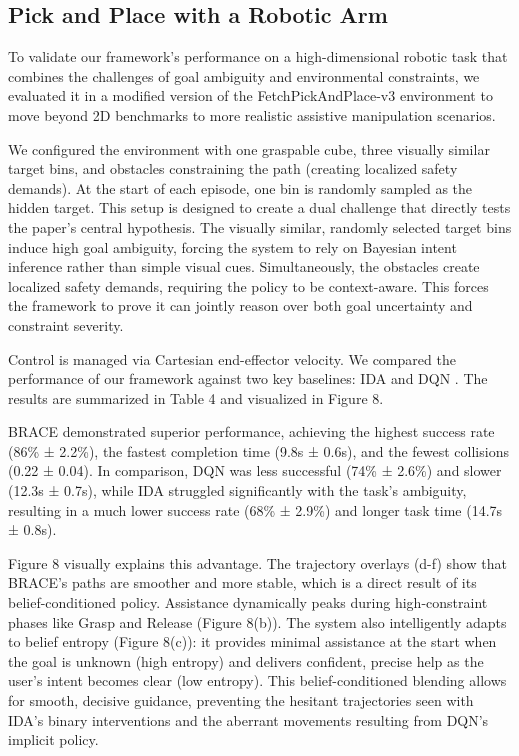 \documentclass[11pt]{article}
\begin{document}
\subsection{Pick and Place with a Robotic Arm}

To validate our framework's performance on a high-dimensional robotic task that combines the challenges of goal ambiguity and environmental constraints, we evaluated it in a modified version of the FetchPickAndPlace-v3 environment to move beyond 2D benchmarks to more realistic assistive manipulation scenarios. \cite{ARAS}

We configured the environment with one graspable cube, three visually similar target bins, and obstacles constraining the path (creating localized safety demands). At the start of each episode, one bin is randomly sampled as the hidden target. This setup is designed to create a dual challenge that directly tests the paper's central hypothesis. The visually similar, randomly selected target bins induce high goal ambiguity, forcing the system to rely on Bayesian intent inference rather than simple visual cues. Simultaneously, the obstacles create localized safety demands, requiring the policy to be context-aware. This forces the framework to prove it can jointly reason over both goal uncertainty and constraint severity.

Control is managed via Cartesian end-effector velocity. We compared the performance of our framework against two key baselines: IDA \cite{IDA} and DQN \cite{DQN}. The results are summarized in Table 4 and visualized in Figure 8.

BRACE demonstrated superior performance, achieving the highest success rate (86\% ± 2.2\%), the fastest completion time (9.8s ± 0.6s), and the fewest collisions (0.22 ± 0.04). In comparison, DQN was less successful (74\% ± 2.6\%) and slower (12.3s ± 0.7s), while IDA struggled significantly with the task's ambiguity, resulting in a much lower success rate (68\% ± 2.9\%) and longer task time (14.7s ± 0.8s).

Figure 8 visually explains this advantage. The trajectory overlays (d-f) show that BRACE's paths are smoother and more stable, which is a direct result of its belief-conditioned policy. Assistance dynamically peaks during high-constraint phases like Grasp and Release (Figure 8(b)). The system also intelligently adapts to belief entropy (Figure 8(c)): it provides minimal assistance at the start when the goal is unknown (high entropy) and delivers confident, precise help as the user's intent becomes clear (low entropy). This belief-conditioned blending allows for smooth, decisive guidance, preventing the hesitant trajectories seen with IDA's binary interventions and the aberrant movements resulting from DQN's implicit policy.
\end{document}

